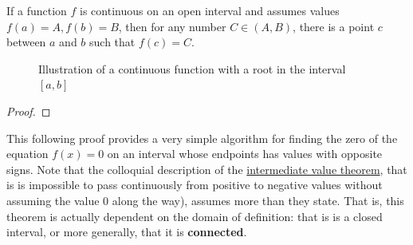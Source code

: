     \begin{theorem}
      \label{thm:intermediate-value-theorem}
      If a function $f$ is continuous on an open interval and assumes values $f(a) = A, f(b) = B$, then for any number $C \in (A, B)$, there is a point $c$ between $a$ and $b$ such that $f(c) = C$. 

      \begin{figure}[H]
        \centering 
        \caption{Illustration of a continuous function with a root in the interval $[a,b]$}
        \label{fig:continuous-function-root}
      \end{figure}
    \end{theorem}
    \begin{proof}

    \end{proof}

    This following proof provides a very simple algorithm for finding the zero of the equation $f(x) = 0$ on an interval whose endpoints has values with opposite signs. 
    Note that the colloquial description of the \hyperref[thm:intermediate-value-theorem]{intermediate value theorem}, that is is impossible to pass continuously from positive to negative values without assuming the value $0$ along the way), assumes more than they state. That is, this theorem is actually dependent on the domain of definition: that is is a closed interval, or more generally, that it is \textbf{connected}. 


